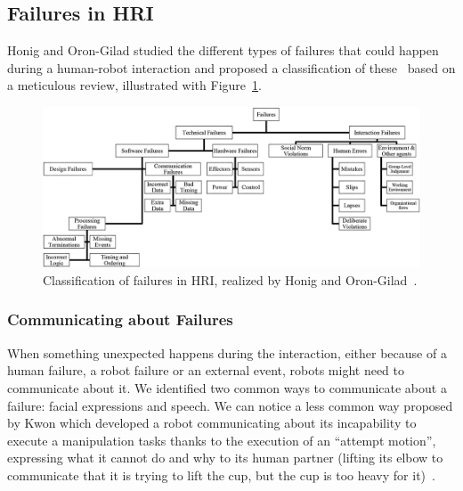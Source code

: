 \documentclass[a4paper,11pt,twoside]{StyleThese}
\begin{document}
\subsection{Failures in HRI}
Honig and Oron-Gilad studied the different types of failures that could happen during a human-robot interaction and proposed a classification of these~\cite{honig_2018_understanding} based on a meticulous review, illustrated with Figure~\ref{chap2:fig:err_hri}.

\begin{figure}[!ht]
	\includegraphics[width=\linewidth]{figures/chapter1/failures_hri.jpg}
	\caption{Classification of failures in HRI, realized by Honig and Oron-Gilad~\cite{honig_2018_understanding}.}
	\label{chap2:fig:err_hri}
\end{figure}

\subsubsection{Communicating about Failures}
When something unexpected happens during the interaction, either because of a human failure, a robot failure or an external event, robots might need to communicate about it. We identified two common ways to communicate about a failure: facial expressions and speech. We can notice a less common way proposed by Kwon \etal{} which developed a robot communicating about its incapability to execute a manipulation tasks thanks to the execution of an ``attempt motion'', expressing what it cannot do and why to its human partner (\eg lifting its elbow to communicate that it is trying to lift the cup, but the cup is too heavy for it)~\cite{kwon_2018_expressing}. 
\end{document}
